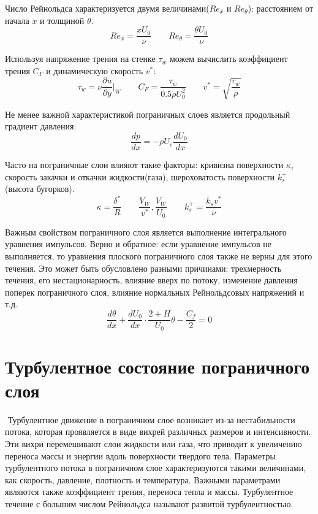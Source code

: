 	Число Рейнольдса характеризуется двумя величинами($Re_x$ и $Re_\theta$): расстоянием от начала $x$ и толщиной $\theta$.
	\begin{equation}
		Re_x = \frac{xU_0}{\nu} \qquad Re_\theta = \frac{\theta U_0}{\nu}
	\end{equation}
	
	Используя напряжение трения на стенке $\tau_w$ можем вычислить коэффициент трения $C_F$ и динамическую скорость $v^*$:
	\begin{equation}
		\tau_w = \nu\frac{\partial u}{\partial y}\bigg|_W \qquad C_F = \frac{\tau_w}{0.5\rho U_0^2} \qquad v^* = \sqrt{\frac{\tau_w}{\rho}}
	\end{equation}
	
	Не менее важной характеристикой пограничных слоев является продольный градиент давления:
	\begin{equation}
		\frac{dp}{dx} = -\rho U_e \frac{dU_0}{dx}
	\end{equation}
	
	Часто на пограничные слои влияют такие факторы: кривизна поверхности $\kappa$, скорость закачки и откачки жидкости(газа), шероховатость поверхности $k_s^+$(высота бугорков).
	\begin{equation}
		\kappa = \frac{\delta^*}{R} \qquad \frac{V_W}{v^*}, \frac{V_W}{U_0} \qquad k_s^+ = \frac{k_s v^*}{\nu}
	\end{equation}
	
	Важным свойством пограничного слоя является выполнение интегрального уравнения импульсов. Верно и обратное: если уравнение импульсов не выполняется, то уравнения плоского пограничного слоя также не верны для этого течения. Это может быть обусловлено разными причинами: трехмерность течения, его нестационарность, влияние вверх по потоку, изменение давления поперек пограничного слоя, влияние нормальных Рейнольдсовых напряжений и т.д.
	\begin{equation}
		\frac{d\theta}{dx} + \frac{dU_0}{dx}\cdot\frac{2 + H}{U_0}\theta - \frac{C_f}{2} = 0
	\end{equation}

\section{Турбулентное состояние пограничного слоя}
‍
	Турбулентное движение в пограничном слое возникает из-за нестабильности потока, которая проявляется в виде вихрей различных размеров и интенсивности. Эти вихри перемешивают слои жидкости или газа, что приводит к увеличению переноса массы и энергии вдоль поверхности твердого тела. Параметры турбулентного потока в пограничном слое характеризуются такими величинами, как скорость, давление, плотность и температура. Важными параметрами являются также коэффициент трения, переноса тепла и массы. Турбулентное течение с большим числом Рейнольдса называют развитой турбулентностью.
	
